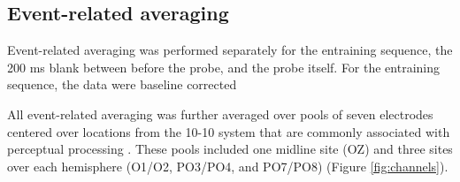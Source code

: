 \documentclass[dwyatte_dissertation.tex]{subfiles}
\begin{document}
\subsection{Event-related averaging}
Event-related averaging was performed separately for the entraining sequence, the 200 ms blank between before the probe, and the probe itself. For the entraining sequence, the data were baseline corrected 


All event-related averaging was further averaged over pools of seven electrodes centered over locations from the 10-10 system that are commonly associated with perceptual processing \cite[e.g.,]{DohertyRaoMesulamEtAl05,RohenkohlNobre11}. These pools included one midline site (OZ) and three sites over each hemisphere (O1/O2, PO3/PO4, and PO7/PO8) (Figure \ref{fig:channels}).

\end{document}
